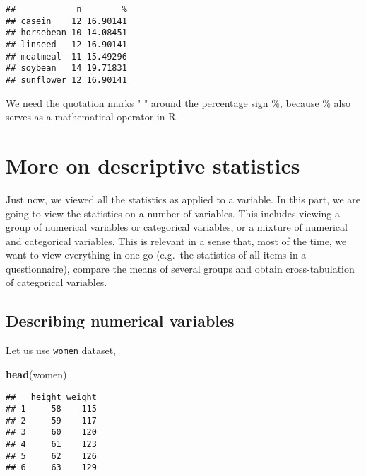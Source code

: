 \documentclass[]{book}
\newenvironment{Shaded}{\begin{snugshade}}{\end{snugshade}}
\newcommand{\KeywordTok}[1]{\textcolor[rgb]{0.13,0.29,0.53}{\textbf{#1}}}
\newcommand{\DataTypeTok}[1]{\textcolor[rgb]{0.13,0.29,0.53}{#1}}
\newcommand{\DecValTok}[1]{\textcolor[rgb]{0.00,0.00,0.81}{#1}}
\newcommand{\StringTok}[1]{\textcolor[rgb]{0.31,0.60,0.02}{#1}}
\newcommand{\OperatorTok}[1]{\textcolor[rgb]{0.81,0.36,0.00}{\textbf{#1}}}
\newcommand{\NormalTok}[1]{#1}
\theoremstyle{definition}
\theoremstyle{definition}
\theoremstyle{remark}
\begin{document}
\begin{Shaded}
\end{Shaded}

\begin{verbatim}
##            n        %
## casein    12 16.90141
## horsebean 10 14.08451
## linseed   12 16.90141
## meatmeal  11 15.49296
## soybean   14 19.71831
## sunflower 12 16.90141
\end{verbatim}

We need the quotation marks " " around the percentage sign \%, because
\% also serves as a mathematical operator in R.

\section{More on descriptive
statistics}\label{more-on-descriptive-statistics}

Just now, we viewed all the statistics as applied to a variable. In this
part, we are going to view the statistics on a number of variables. This
includes viewing a group of numerical variables or categorical
variables, or a mixture of numerical and categorical variables. This is
relevant in a sense that, most of the time, we want to view everything
in one go (e.g.~the statistics of all items in a questionnaire), compare
the means of several groups and obtain cross-tabulation of categorical
variables.

\subsection{Describing numerical
variables}\label{describing-numerical-variables}

Let us use \texttt{women} dataset,

\begin{Shaded}
\begin{Highlighting}[]
\KeywordTok{head}\NormalTok{(women)}
\end{Highlighting}
\end{Shaded}

\begin{verbatim}
##   height weight
## 1     58    115
## 2     59    117
## 3     60    120
## 4     61    123
## 5     62    126
## 6     63    129
\end{verbatim}
\end{document}
